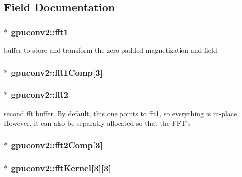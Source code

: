 \subsection{Field Documentation}
\hypertarget{structgpuconv2_adfe815ea2f0f1bc3fcc9253b0bf7769f}{
\subsubsection[{fft1}]{$\ast$ {\bf gpuconv2::fft1}}}
\label{structgpuconv2_adfe815ea2f0f1bc3fcc9253b0bf7769f}


buffer to store and transform the zero-\/padded magnetization and field 

\hypertarget{structgpuconv2_aa04ceddba4c4ec6d485fcc1df2545a6a}{
\subsubsection[{fft1Comp}]{$\ast$ {\bf gpuconv2::fft1Comp}\mbox{[}3\mbox{]}}}
\label{structgpuconv2_aa04ceddba4c4ec6d485fcc1df2545a6a}
\hypertarget{structgpuconv2_afa4419639a375a47f5665586401ae8cc}{
\subsubsection[{fft2}]{$\ast$ {\bf gpuconv2::fft2}}}
\label{structgpuconv2_afa4419639a375a47f5665586401ae8cc}


second fft buffer. By default, this one points to fft1, so everything is in-\/place. However, it can also be separatly allocated so that the FFT's 

\hypertarget{structgpuconv2_ae20f81460c1c8355a7af279f9c660468}{
\subsubsection[{fft2Comp}]{$\ast$ {\bf gpuconv2::fft2Comp}\mbox{[}3\mbox{]}}}
\label{structgpuconv2_ae20f81460c1c8355a7af279f9c660468}
\hypertarget{structgpuconv2_a2f94841448d094437cccceaf0b468bdc}{
\subsubsection[{fftKernel}]{$\ast$ {\bf gpuconv2::fftKernel}\mbox{[}3\mbox{]}\mbox{[}3\mbox{]}}}
\label{structgpuconv2_a2f94841448d094437cccceaf0b468bdc}


